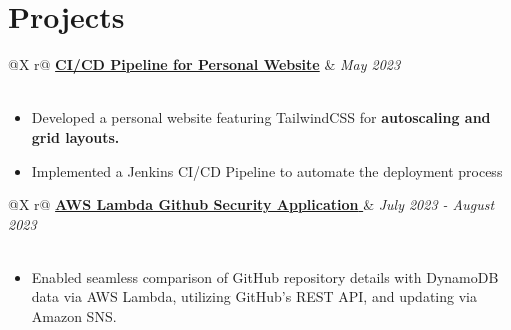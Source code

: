 \documentclass[a4paper,12pt]{article}
\begin{document}
\section{Projects}

\begin{tabularx}{\linewidth}{ @{}X r@{} }
    \href{https://ishan-next-react-website.vercel.app/}{\textbf{CI/CD Pipeline for Personal Website}} & \textit{May 2023} \\
     \\
\end{tabularx} 


\begin{minipage}{\linewidth}
    \begin{itemize}[nosep,after=\strut, leftmargin=1em]
    \item Developed a personal website featuring TailwindCSS for \textbf{autoscaling and grid layouts. }

    \item Implemented a Jenkins CI/CD Pipeline to automate the deployment process
    \end{itemize}
\end{minipage}




    

\begin{tabularx}{\linewidth}{ @{}X r@{} }
    \href{https://github.com/IshanPhadte776/LambdaEventTriggering}{\textbf{AWS Lambda Github Security Application }} & \textit{July 2023 - August 2023} \\
     \\
\end{tabularx}





\begin{minipage}{\linewidth}
\begin{itemize}[nosep,after=\strut, leftmargin=1em]
        \item Enabled seamless comparison of GitHub repository details with DynamoDB data via AWS Lambda, utilizing GitHub's REST API, and updating via Amazon SNS.
    \end{itemize}
\end{minipage}
\end{document}
